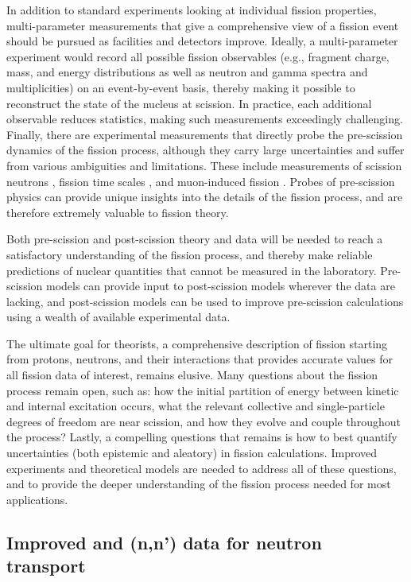 \documentclass[letterpaper]{ar-1col}
\begin{document}
In addition to standard experiments looking at individual fission properties, multi-parameter measurements that give a comprehensive view of a fission event should be pursued as facilities and detectors improve.
Ideally, a multi-parameter experiment would record all possible fission observables (e.g., fragment charge, mass, and energy distributions as well as neutron and gamma spectra and multiplicities) on an event-by-event basis, thereby making it possible to reconstruct the state of the nucleus at scission.
In practice, each additional observable reduces statistics, making such measurements exceedingly challenging.
Finally, there are experimental measurements that directly probe the pre-scission dynamics of the fission process, although they carry large uncertainties and suffer from various ambiguities and limitations.
These include measurements of scission neutrons \cite{Petrov2009}, fission time scales \cite{Jac09}, and muon-induced fission \cite{Mar80}.
Probes of pre-scission physics can provide unique insights into the details of the fission process, and are therefore extremely valuable to fission theory.

Both pre-scission and post-scission theory and data will be needed to reach a satisfactory understanding of the fission process, and thereby make reliable predictions of nuclear quantities that cannot be measured in the laboratory.
Pre-scission models can provide input to post-scission models wherever the data are lacking, and post-scission models can be used to improve pre-scission calculations using a wealth of available experimental data.

The ultimate goal for theorists, a comprehensive description of fission starting from protons, neutrons, and their interactions that provides accurate values for all fission data of interest, remains elusive.  Many questions about the fission process remain open, such as: how the initial partition of energy between kinetic and internal excitation occurs, what the relevant collective and single-particle degrees of freedom are near scission, and how they evolve and couple throughout the process? Lastly, a compelling questions that remains is how to best quantify uncertainties (both epistemic and aleatory) in fission calculations.  Improved experiments and theoretical models are needed to address all of these questions, and to provide the deeper understanding of the fission process needed for most applications.  

\subsection{Improved \texorpdfstring{}{235,238U} and \texorpdfstring{}{239Pu}(n,n') data for neutron transport}\label{sec:n_transport}
\end{document}
